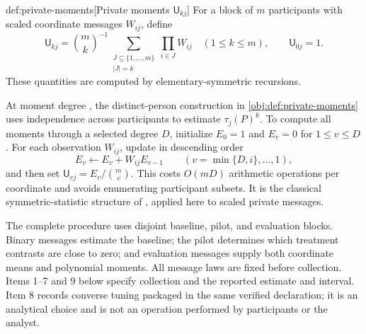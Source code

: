 \documentclass[11pt]{article}
\begin{document}
\begin{definitionv}{def:private-moments}[Private moments $\mathsf U_{kj}$]
For a block of \(m\) participants with scaled coordinate messages \(W_{ij}\), define
\[
\mathsf U_{kj}
=
\binom{m}{k}^{-1}
\sum_{\substack{J\subseteq\{1,\ldots,m\}\\ |J|=k}}
\prod_{i\in J}W_{ij}
\quad(1\le k\le m),
\qquad
\mathsf U_{0j}=1.
\]
These quantities are computed by elementary-symmetric recursions.
\end{definitionv}

At moment degree , the distinct-person construction in \cref{obj:def:private-moments} uses independence across participants to estimate \(\tau_j(P)^k\). To compute all moments through a selected degree \(D\), initialize \(E_0=1\) and \(E_v=0\) for \(1\le v\le D\). For each observation \(W_{ij}\), update in descending order
\[
E_v\leftarrow E_v+W_{ij}E_{v-1}
\qquad(v=\min\{D,i\},\ldots,1),
\]
and then set \(\mathsf U_{vj}=E_v/\binom mv\). This costs \(O(mD)\) arithmetic operations per coordinate and avoids enumerating participant subsets. It is the classical symmetric-statistic structure of \citet{Hoeffding1948}, applied here to scaled private messages.

The complete procedure uses disjoint baseline, pilot, and evaluation blocks. Binary messages estimate the baseline; the pilot determines which treatment contrasts are close to zero; and evaluation messages supply both coordinate means and polynomial moments. All message laws are fixed before collection. Items 1--7 and 9 below specify collection and the reported estimate and interval. Item 8 records converse tuning packaged in the same verified declaration; it is an analytical choice and is not an operation performed by participants or the analyst.
\end{document}

